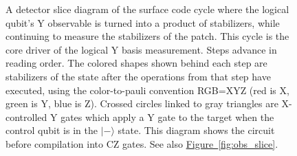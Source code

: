 \documentclass[onecolumn,unpublished,a4paper]{quantumarticle}
\theoremstyle{definition}
\theoremstyle{definition}
\theoremstyle{definition}
\newcommand{\fig}[1]{\hyperref[fig:#1]{Figure~\ref*{fig:#1}}}
\begin{document}
\begin{figure}
    \centering
    \caption{
        A detector slice diagram of the surface code cycle where the logical qubit's Y observable is turned into a product of stabilizers, while continuing to measure the stabilizers of the patch.
        This cycle is the core driver of the logical Y basis measurement.
        Steps advance in reading order.
        The colored shapes shown behind each step are stabilizers of the state after the operations from that step have executed, using the color-to-pauli convention RGB=XYZ (red is X, green is Y, blue is Z).
        Crossed circles linked to gray triangles are X-controlled Y gates which apply a Y gate to the target when the control qubit is in the $|-\rangle$ state.
        This diagram shows the circuit before compilation into CZ gates.
        See also \fig{obs_slice}.
    }
    \label{fig:transition_detector_slices}
\end{figure}
\end{document}
